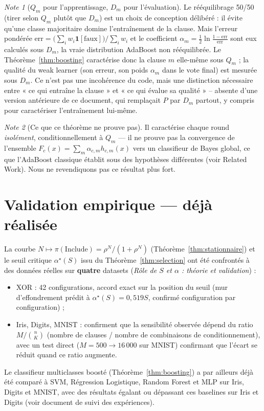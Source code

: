\documentclass[12pt,a4paper]{article}
\theoremstyle{remark}
\newtheorem{note}{Note}[section]
\newcommand{\Inc}{\ensuremath{\mathrm{Include}}}
\begin{document}
\begin{note}[$Q_m$ pour l'apprentissage, $D_m$ pour l'évaluation]
Le rééquilibrage 50/50 (tirer selon $Q_m$ plutôt que $D_m$) est un choix de
conception délibéré : il évite qu'une classe majoritaire domine l'entraînement
de la clause. Mais l'erreur pondérée
$\mathrm{err}=\bigl(\sum_i w_i\mathbf 1[\text{faux}]\bigr)/\sum_i w_i$ et le
coefficient $\alpha_m=\tfrac12\ln\frac{1-\mathrm{err}}{\mathrm{err}}$ sont eux
calculés sous $D_m$, la vraie distribution AdaBoost non rééquilibrée. Le
Théorème~\ref{thm:boosting} caractérise donc la clause $m$ elle-même sous
$Q_m$ ; la qualité du weak learner (son erreur, son poids $\alpha_m$ dans le
vote final) est mesurée sous $D_m$. Ce n'est pas une incohérence du code, mais
une distinction nécessaire entre « ce qui entraîne la clause » et « ce qui
évalue sa qualité » -- absente d'une version antérieure de ce document, qui
remplaçait $P$ par $D_m$ partout, y compris pour caractériser l'entraînement
lui-même.
\end{note}

\begin{note}[Ce que ce théorème ne prouve pas]
Il caractérise chaque round \emph{isolément}, conditionnellement à $Q_m$ ---
il ne prouve pas la convergence de l'ensemble $F_c(x)=\sum_m
\alpha_{c,m}h_{c,m}(x)$ vers un classifieur de Bayes global, ce que
l'AdaBoost classique établit sous des hypothèses différentes (voir Related
Work). Nous ne revendiquons pas ce résultat plus fort.
\end{note}

\section{Validation empirique --- déjà réalisée}

La courbe $N\mapsto\pi(\Inc)=\rho^N/(1+\rho^N)$ (Théorème~\ref{thm:stationnaire})
et le seuil critique $\alpha^\star(S)$ issu du Théorème~\ref{thm:selection} ont
été confrontés à des données réelles sur \textbf{quatre} datasets
(\textit{Rôle de $S$ et $\alpha$ : théorie et validation}) :
\begin{itemize}
  \item XOR : 42 configurations, accord exact sur la position du seuil (mur
  d'effondrement prédit à $\alpha^\star(S)=0{,}519S$, confirmé configuration par
  configuration) ;
  \item Iris, Digits, MNIST : confirment que la sensibilité observée dépend du
  ratio $M/\binom{n}{K}$ (nombre de clauses / nombre de combinaisons de
  conditionnement), avec un test direct ($M{=}500\to16\,000$ sur MNIST)
  confirmant que l'écart se réduit quand ce ratio augmente.
\end{itemize}
Le classifieur multiclasses boosté (Théorème~\ref{thm:boosting}) a par ailleurs
déjà été comparé à SVM, Régression Logistique, Random Forest et MLP sur Iris,
Digits et MNIST, avec des résultats égalant ou dépassant ces baselines sur
Iris et Digits (voir document de suivi des expériences).
\end{document}
